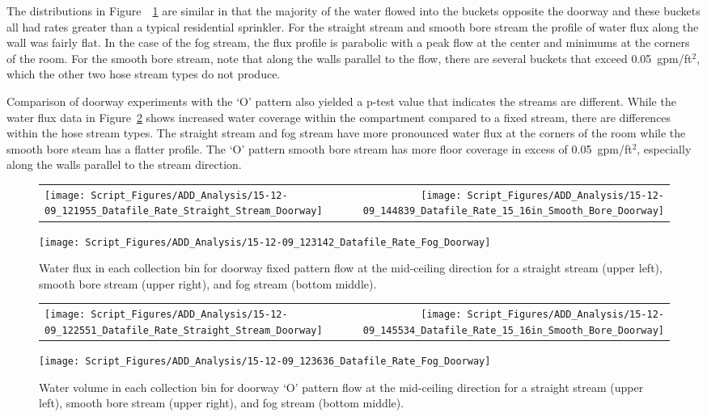 \documentclass[12pt,oneside]{book}
\begin{document}
The distributions in Figure~~\ref{fig:Doorway_Varying_Nozzle_Types_Fixed_Pattern} are similar in that the majority of the water flowed into the buckets opposite the doorway and these buckets all had rates greater than a typical residential sprinkler. For the straight stream and smooth bore stream the profile of water flux along the wall was fairly flat. In the case of the fog stream, the flux profile is parabolic with a peak flow at the center and minimums at the corners of the room. For the smooth bore stream, note that along the walls parallel to the flow, there are several buckets that exceed 0.05~gpm/ft$^2$, which the other two hose stream types do not produce. 

Comparison of doorway experiments with the `O' pattern also yielded a p-test value that indicates the streams are different. While the water flux data in Figure~\ref{fig:Doorway_Varying_Nozzle_Types_O_Pattern} shows increased water coverage within the compartment compared to a fixed stream, there are differences within the hose stream types. The straight stream and fog stream have more pronounced water flux at the corners of the room while the smooth bore steam has a flatter profile. The `O' pattern smooth bore stream has more floor coverage in excess of 0.05~gpm/ft$^2$, especially along the walls parallel to the stream direction.


\begin{figure}[!ht]
\begin{tabular*}{\textwidth}{lr}
\texttt{[image: Script\_Figures/ADD\_Analysis/15-12-09\_121955\_Datafile\_Rate\_Straight\_Stream\_Doorway]} &
\texttt{[image: Script\_Figures/ADD\_Analysis/15-12-09\_144839\_Datafile\_Rate\_15\_16in\_Smooth\_Bore\_Doorway]} \\
\end{tabular*}
\centering
\texttt{[image: Script\_Figures/ADD\_Analysis/15-12-09\_123142\_Datafile\_Rate\_Fog\_Doorway]} \\
\caption[Water Flux for Varying Doorway Fixed Pattern Hose Stream Types]{Water flux in each collection bin for doorway fixed pattern flow at the mid-ceiling direction for a straight stream (upper left), smooth bore stream (upper right), and fog stream (bottom middle).}
\label{fig:Doorway_Varying_Nozzle_Types_Fixed_Pattern}
\end{figure}

\begin{figure}[ht]
\begin{tabular*}{\textwidth}{lr}
\texttt{[image: Script\_Figures/ADD\_Analysis/15-12-09\_122551\_Datafile\_Rate\_Straight\_Stream\_Doorway]} &
\texttt{[image: Script\_Figures/ADD\_Analysis/15-12-09\_145534\_Datafile\_Rate\_15\_16in\_Smooth\_Bore\_Doorway]} \\
\end{tabular*}
\centering
\texttt{[image: Script\_Figures/ADD\_Analysis/15-12-09\_123636\_Datafile\_Rate\_Fog\_Doorway]}
\caption[Water Flux for Varying Doorway `O' Pattern Hose Stream Types]{Water volume in each collection bin for doorway `O' pattern flow at the mid-ceiling direction for a straight stream (upper left), smooth bore stream (upper right), and fog stream (bottom middle).}
\label{fig:Doorway_Varying_Nozzle_Types_O_Pattern}
\end{figure}
\end{document}
